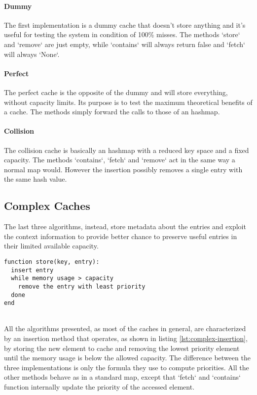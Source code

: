 \paragraph{Dummy} The first implementation is a dummy cache that doesn't store anything and it's useful for testing the system in condition of 100\% misses. The methods `store` and `remove` are just empty, while `contains` will always return false and `fetch` will always `None`.
\paragraph{Perfect} The perfect cache is the opposite of the dummy and will store everything, without capacity limits. Its purpose is to test the maximum theoretical benefits of a cache. The methods simply forward the calls to those of an hashmap.
\paragraph{Collision} The collision cache is basically an hashmap with a reduced key space and a fixed capacity. The methods `contains`, `fetch` and `remove` act in the same way a normal map would. However the insertion possibly removes a single entry with the same hash value.\\

\subsection{Complex Caches}
The last three algorithms, instead, store metadata about the entries and exploit the context information to provide better chance to preserve useful entries in their limited available capacity.\\
\begin{minipage}{\textwidth}
\begin{lstlisting}[caption={Complex cache insertion},label={lst:complex-insertion},xleftmargin=.15\textwidth]
function store(key, entry):
  insert entry
  while memory usage > capacity
    remove the entry with least priority
  done
end
\end{lstlisting}
\end{minipage}\\
All the algorithms presented, as most of the caches in general, are characterized by an insertion method that operates, as shown in listing \ref{lst:complex-insertion}, by storing the new element to cache and removing the lowest priority element until the memory usage is below the allowed capacity. The difference between the three implementations is only the formula they use to compute priorities. All the other methods behave as in a standard map, except that `fetch` and `contains` function internally update the priority of the accessed element.

